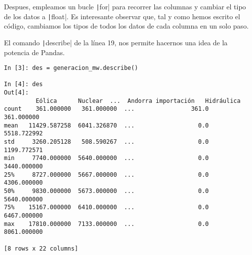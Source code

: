 \begin{paracol}{2}
 Despues, empleamos un bucle \texttt|for| para recorrer las columnas y cambiar el tipo de los datos a \texttt|float|. Es interesante observar que, tal y como hemos escrito el código, cambiamos los tipos de todos los datos de cada columna en un solo paso.

El comando \texttt|describe| de la línea 19, nos permite hacernos una idea de la potencia de Pandas.

\end{paracol}
\begin{center}
\begin{minipage}{\textwidth}
	\begin{verbatim}
In [3]: des = generacion_mw.describe()

In [4]: des
Out[4]: 
	     Eólica      Nuclear  ...  Andorra importación   Hidráulica
count    361.000000   361.000000  ...                361.0   361.000000
mean   11429.587258  6041.326870  ...                  0.0  5518.722992
std     3260.205128   508.590267  ...                  0.0  1199.772571
min     7740.000000  5640.000000  ...                  0.0  3440.000000
25%     8727.000000  5667.000000  ...                  0.0  4306.000000
50%     9830.000000  5673.000000  ...                  0.0  5640.000000
75%    15167.000000  6410.000000  ...                  0.0  6467.000000
max    17810.000000  7133.000000  ...                  0.0  8061.000000

[8 rows x 22 columns]	\end{verbatim}
\end{minipage}
\end{center} 

